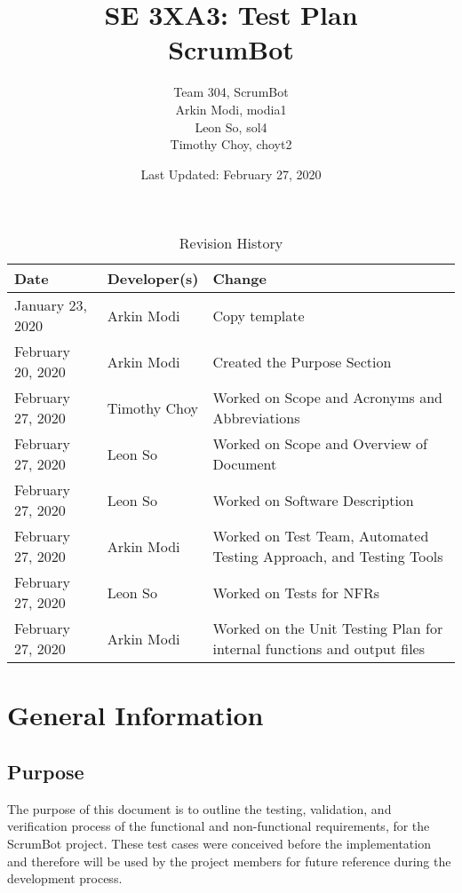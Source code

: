 \documentclass[12pt, titlepage]{article}
\title{SE 3XA3: Test Plan\\ScrumBot}
\author{
    Team 304, ScrumBot
        \\ Arkin Modi, modia1
        \\ Leon So, sol4
        \\ Timothy Choy, choyt2
}
\date{Last Updated: February 27, 2020}
\begin{document}
\newpage
\maketitle

\tableofcontents
\listoftables
\listoffigures

\newpage

\begin{table}[!hbp]
    \caption{Revision History} \label{TblRevisionHistory}
    \begin{tabularx}{\textwidth}{llX}
        \toprule
            \textbf{Date} & \textbf{Developer(s)} & \textbf{Change}\\
        \midrule
            January 23, 2020 & Arkin Modi & Copy template\\
            February 20, 2020 & Arkin Modi & Created the Purpose Section\\
            February 27, 2020 & Timothy Choy & Worked on Scope and Acronyms and Abbreviations\\
            February 27, 2020 & Leon So & Worked on Scope and Overview of Document\\
            February 27, 2020 & Leon So & Worked on Software Description\\
            February 27, 2020 & Arkin Modi & Worked on Test Team, Automated Testing Approach, and Testing Tools\\
            February 27, 2020 & Leon So & Worked on Tests for NFRs\\
            February 27, 2020 & Arkin Modi & Worked on the Unit Testing Plan for internal functions and output files\\
        \bottomrule
    \end{tabularx}
\end{table}


\newpage


\section{General Information}

\subsection{Purpose}
The purpose of this document is to outline the testing, validation, and verification process of the functional and non-functional requirements, for the ScrumBot project. These test cases were conceived before the implementation and therefore will be used by the project members for future reference during the development process.
\end{document}
